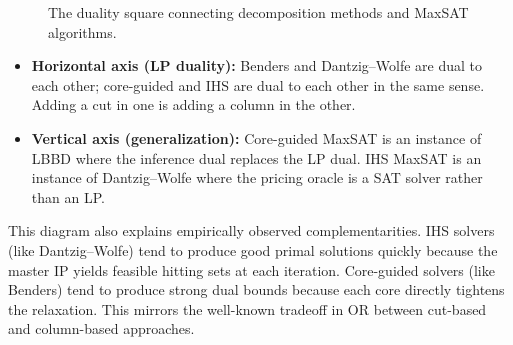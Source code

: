 \documentclass[11pt,a4paper]{article}
\begin{document}
\begin{figure}[h]
\centering
{}
\caption{The duality square connecting decomposition methods and MaxSAT algorithms.}
\label{fig:square}
\end{figure}

\begin{itemize}
\item \textbf{Horizontal axis (LP duality):} Benders and Dantzig--Wolfe are
dual to each other; core-guided and IHS are dual to each other in the same
sense. Adding a cut in one is adding a column in the other.
\item \textbf{Vertical axis (generalization):} Core-guided MaxSAT is an
instance of LBBD where the inference dual replaces the LP dual. IHS MaxSAT
is an instance of Dantzig--Wolfe where the pricing oracle is a SAT solver
rather than an LP.
\end{itemize}

This diagram also explains empirically observed complementarities. IHS solvers
(like Dantzig--Wolfe) tend to produce good primal solutions quickly because
the master IP yields feasible hitting sets at each iteration. Core-guided
solvers (like Benders) tend to produce strong dual bounds because each core
directly tightens the relaxation. This mirrors the well-known tradeoff in
OR between cut-based and column-based approaches.
\end{document}

